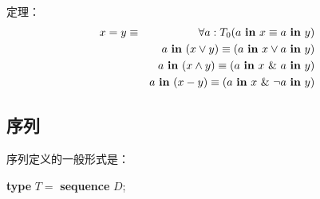 \noindent
定理：
\begin{eqnarray*}
	x = y &\equiv& \forall a:T_0(a \text{ \textbf{in} } x \equiv a \text{ \textbf{in} } y)\\
	&&a \text{ \textbf{in} } (x \lor y) \equiv (a \text{ \textbf{in} } x \lor a \text{ \textbf{in} } y) \\
	&&a \text{ \textbf{in} } (x \land y) \equiv (a \text{ \textbf{in} } x\ \&\ a \text{ \textbf{in} } y) \\
	&&a \text{ \textbf{in} } (x - y) \equiv (a \text{ \textbf{in} } x\ \&\ \neg a \text{ \textbf{in} } y) \\
\end{eqnarray*}

\subsection{序列}

序列定义的一般形式是：

\quad \textbf{type} $T =$ \textbf{sequence} $D$;

